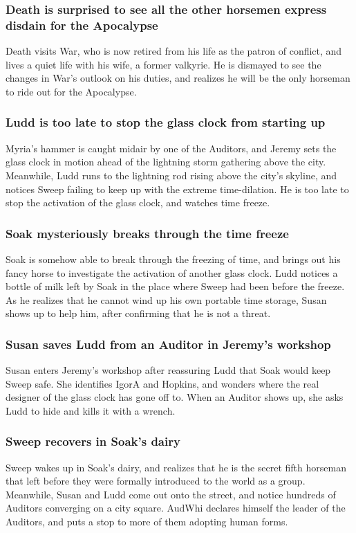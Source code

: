 \subsubsection{\Gls{Death} is surprised to see all the other horsemen express disdain for the
    Apocalypse}
\Gls{Death} visits \Gls{War}, who is now retired from his life as the patron of conflict, and lives
a quiet life with his wife, a former valkyrie. He is dismayed to see the changes in \Gls{War}'s
outlook on his duties, and realizes he will be the only horseman to ride out for the Apocalypse.

\subsubsection{\Gls{Ludd} is too late to stop the glass clock from starting up}
\Gls{Myria}'s hammer is caught midair by one of the Auditors, and \Gls{Jeremy} sets the glass clock
in motion ahead of the lightning storm gathering above the city. Meanwhile, \Gls{Ludd} runs to
the lightning rod rising above the city's skyline, and notices \Gls{Sweep} failing to keep up with
the extreme time-dilation. He is too late to stop the activation of the glass clock, and watches
time freeze.

\subsubsection{\Gls{Soak} mysteriously breaks through the time freeze}
\Gls{Soak} is somehow able to break through the freezing of time, and brings out his fancy horse to
investigate the activation of another glass clock. \Gls{Ludd} notices a bottle of milk left by
\Gls{Soak} in the place where \Gls{Sweep} had been before the freeze. As he realizes that he cannot
wind up his own portable time storage, \Gls{Susan} shows up to help him, after confirming that he
is not a threat.

\subsubsection{\Gls{Susan} saves \Gls{Ludd} from an Auditor in \Gls{Jeremy}'s workshop}
\Gls{Susan} enters \Gls{Jeremy}'s workshop after reassuring \Gls{Ludd} that \Gls{Soak} would keep
\Gls{Sweep} safe. She identifies \Gls{IgorA} and \Gls{Hopkins}, and wonders where the real designer
of the glass clock has gone off to. When an Auditor shows up, she asks \Gls{Ludd} to hide and kills
it with a wrench.

\subsubsection{\Gls{Sweep} recovers in \Gls{Soak}'s dairy}
\Gls{Sweep} wakes up in \Gls{Soak}'s dairy, and realizes that he is the secret fifth horseman that
left before they were formally introduced to the world as a group. Meanwhile, \Gls{Susan} and
\Gls{Ludd} come out onto the street, and notice hundreds of Auditors converging on a city square.
\Gls{AudWhi} declares himself the leader of the Auditors, and puts a stop to more of them adopting
human forms.

